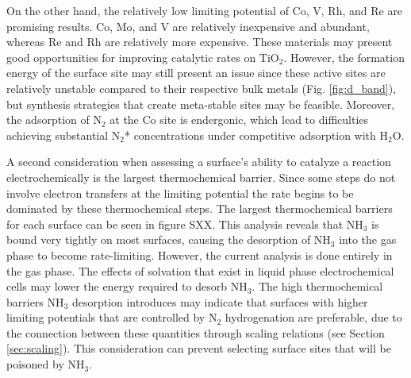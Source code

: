 On the other hand, the relatively low limiting potential of Co, V, Rh, and Re are promising results. Co, Mo, and V are relatively inexpensive and abundant, whereas Re and Rh are relatively more expensive. These materials may present good opportunities for improving catalytic rates on TiO$_2$. However, the formation energy of the surface site may still present an issue since these active sites are relatively unstable compared to their respective bulk metals (Fig. \ref{fig:d_band}), but synthesis strategies that create meta-stable sites may be feasible. Moreover, the adsorption of N$_2$ at the Co site is endergonic, which lead to difficulties achieving substantial N$_2$* concentrations under competitive adsorption with H$_2$O. %

A second consideration when assessing a surface's ability to catalyze a reaction electrochemically is the largest thermochemical barrier. Since some steps do not involve electron transfers at the limiting potential the rate begins to be dominated by these thermochemical steps. The largest thermochemical barriers for each surface can be seen in figure SXX. This analysis reveals that NH$_3$ is bound very tightly on most surfaces, causing the desorption of NH$_3$ into the gas phase to become rate-limiting. However, the current analysis is done entirely in the gas phase. The effects of solvation that exist in liquid phase electrochemical cells may lower the energy required to desorb NH$_3$. The high thermochemical barriers NH$_3$ desorption introduces may indicate that surfaces with higher limiting potentials that are controlled by N$_2$ hydrogenation are preferable, due to the connection between these quantities through scaling relations (see Section \ref{sec:scaling}). This consideration can prevent selecting surface sites that will be poisoned by NH$_3$.

